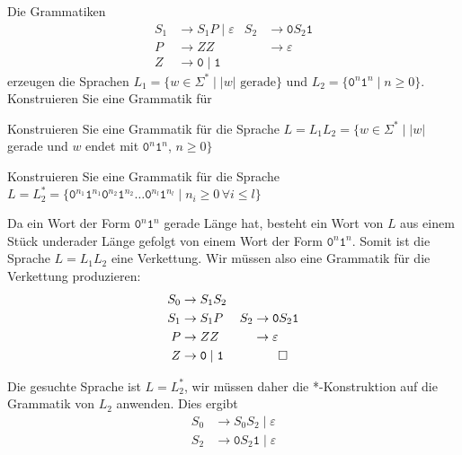 Die Grammatiken
\begin{align*}
S_1 & \to S_1P \;|\; \varepsilon    & S_2 & \to \texttt{0}S_2\texttt{1}    \\
P   & \to ZZ                        &     & \to \varepsilon                \\
Z   & \to \texttt{0}\mid\texttt{1}  &     &                               
\end{align*}
erzeugen die Sprachen $L_1=\{w\in\Sigma^*\mid  \text{$|w|$ gerade}\}$
und $L_2=\{\texttt{0}^n\texttt{1}^n \mid n\ge 0\}$.
Konstruieren Sie eine Grammatik für
\begin{teilaufgaben}
\item Konstruieren Sie eine Grammatik für die Sprache $L=L_1L_2=\{
w\in\Sigma^* \mid
|w|$ gerade und $w$ endet mit $\texttt{0}^n\texttt{1}^n$, $n\ge 0 \}$
\item Konstruieren Sie eine Grammatik für die Sprache $L=L_2^*=\{
\texttt{0}^{n_1}\texttt{1}^{n_1}
\texttt{0}^{n_2}\texttt{1}^{n_2}
\dots
\texttt{0}^{n_l}\texttt{1}^{n_l}
\mid
n_i\ge 0\,\forall i\le l
\}$
\end{teilaufgaben}

\begin{loesung}
\begin{teilaufgaben}
\item
Da ein Wort der Form $\texttt{0}^n\texttt{1}^n$ gerade Länge hat, besteht
ein Wort von $L$ aus einem Stück underader Länge gefolgt von einem
Wort der Form $\texttt{0}^n\texttt{1}^n$.
Somit ist die Sprache $L=L_1L_2$ eine Verkettung.
Wir müssen also eine Grammatik für die Verkettung produzieren:
\begin{align*}
S_0 & \to S_1S_2                    &     &                                \\
S_1 & \to S_1P                      & S_2 & \to \texttt{0}S_2\texttt{1}    \\
P   & \to ZZ                        &     & \to \varepsilon                \\
Z   & \to \texttt{0}\mid\texttt{1}  &     &                               
\qedhere
\end{align*}
\item
Die gesuchte Sprache ist $L=L_2^*$, wir müssen daher die *-Konstruktion
auf die Grammatik von $L_2$ anwenden.
Dies ergibt 
\begin{align*}
S_0 & \to S_0S_2 \mid \varepsilon  \\
S_2 & \to \texttt{0}S_2\texttt{1} \mid \varepsilon
\end{align*}
\end{teilaufgaben}
\end{loesung}




